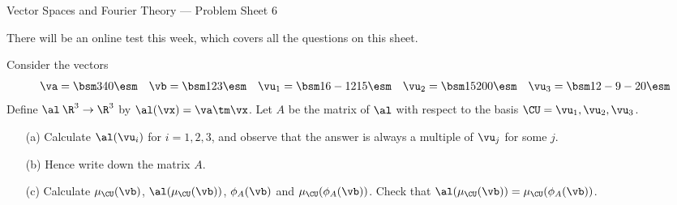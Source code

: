 

\begin{center}
 {\huge Vector Spaces and Fourier Theory ---
   Problem Sheet 6
 }
\end{center}

\begin{rubric}
 There will be an online test this week, which covers all the
 questions on this sheet.
\end{rubric}

\begin{exercise}\label{ex-check-commutative}
 Consider the vectors
 \[ \va   = \bsm  3\\  4\\  0\esm \hspace{1em}
    \vb   = \bsm  1\\  2\\  3\esm \hspace{1em}
    \vu_1 = \bsm 16\\-12\\ 15\esm \hspace{1em}
    \vu_2 = \bsm 15\\ 20\\  0\esm \hspace{1em}
    \vu_3 = \bsm 12\\ -9\\-20\esm 
 \] 
 Define $\al\:\R^3\to\R^3$ by $\al(\vx)=\va\tm\vx$.  Let $A$
 be the matrix of $\al$ with respect to the basis
 $\CU=\vu_1,\vu_2,\vu_3$.  
 \begin{itemize}
  \item[(a)] Calculate $\al(\vu_i)$ for $i=1,2,3$, and observe
   that the answer is always a multiple of $\vu_j$ for some
   $j$.
  \item[(b)] Hence write down the matrix $A$. 
  \item[(c)] Calculate $\mu_{\CU}(\vb)$,
   $\al(\mu_\CU(\vb))$, $\phi_A(\vb)$ and
   $\mu_\CU(\phi_A(\vb))$.  Check that
   $\al(\mu_{\CU}(\vb))=\mu_\CU(\phi_A(\vb))$.
 \end{itemize}
\end{exercise}
